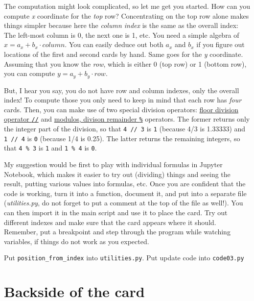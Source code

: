 \documentclass[
]{book}
\begin{document}
The computation might look complicated, so let me get you started. How can you compute \emph{x} coordinate for the \emph{top} row? Concentrating on the top row alone makes things simpler because here the \emph{column index} is the same as the overall index: The left-most column is 0, the next one is 1, etc. You need a simple algebra of \(x = a_x + b_x \cdot column\). You can easily deduce out both \(a_x\) and \(b_x\) if you figure out locations of the first and second cards by hand. Same goes for the \emph{y} coordinate. Assuming that you know the \emph{row}, which is either 0 (top row) or 1 (bottom row), you can compute \(y = a_y + b_y \cdot row\).

But, I hear you say, you do not have row and column indexes, only the overall index! To compute those you only need to keep in mind that each row has \emph{four} cards. Then, you can make use of two special division operators: \href{https://python-reference.readthedocs.io/en/latest/docs/operators/floor_division.html}{floor division operator \texttt{//}} and \href{https://python-reference.readthedocs.io/en/latest/docs/operators/modulus.html}{modulos, divison remainder \texttt{\%}} operators. The former returns only the integer part of the division, so that \texttt{4\ //\ 3} is \texttt{1} (because 4/3 is 1.33333) and \texttt{1\ //\ 4} is \texttt{0} (because 1/4 is 0.25). The latter returns the remaining integers, so that \texttt{4\ \%\ 3} is \texttt{1} and \texttt{1\ \%\ 4} is \texttt{0}.

My suggestion would be first to play with individual formulas in Jupyter Notebook, which makes it easier to try out (dividing) things and seeing the result, putting various values into formulas, etc. Once you are confident that the code is working, turn it into a function, document it, and put into a separate file (\emph{utilities.py}, do not forget to put a comment at the top of the file as well!). You can then import it in the main script and use it to place the card. Try out different indexes and make sure that the card appears where it should. Remember, put a breakpoint and step through the program while watching variables, if things do not work as you expected.

Put \texttt{position\_from\_index} into \texttt{utilities.py}.
Put update code into \texttt{code03.py}

\hypertarget{backside-of-the-card}{%
\section{Backside of the card}\label{backside-of-the-card}}
\end{document}
